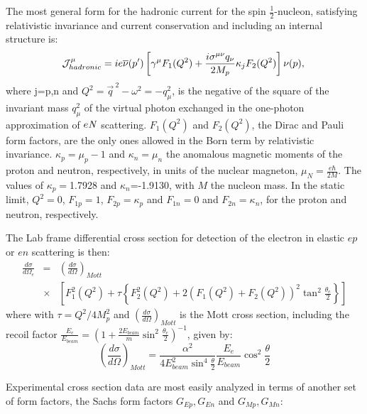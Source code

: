 The most general form for the hadronic current for the spin $\frac{1}{2}$-nucleon, satisfying relativistic invariance
and current conservation and including an internal structure is:\\
\begin{equation}
{\mathcal J}_{hadronic}^{\mu}=ie\overline{\nu}(p')\left[\gamma^{\mu}{{F_1(Q^2)}}+
\frac{i\sigma^{\mu\nu}q_{\nu}}{2M_p}\kappa_{j}{{F_2(Q^2)}}\right]\nu(p), \\
\label{eq:Jhadron}
\end{equation}
\noindent where j=p,n and $Q^2=\vec{q}^{~2}-\omega^2=-q_{\mu}^{ 2}$, is the negative of the square of the
invariant mass $q_{\mu}^2 $ of the virtual photon exchanged in the one-photon
approximation of $e{\it N}$ scattering. $F_1(Q^2)$ and $F_2(Q^2)$, the Dirac and Pauli form factors, are the only ones
allowed in the Born term by relativistic invariance. $\kappa_p=\mu_p-1$ and $\kappa_n=\mu_n$ the anomalous
 magnetic moments of the proton
 and neutron, respectively, in units of the nuclear magneton, $\mu_N=\frac{e\hbar}{2M}$. The values of
$\kappa_p=$1.7928 and $\kappa_n$=-1.9130, with  ${M}$ the nucleon mass.
In the static limit, $Q^2=0$, $F_{1p}=1$, $F_{2p}=\kappa_p$ and $F_{1n}=0$ and $F_{2n}=\kappa_n$,
for the proton and neutron, respectively.

The Lab frame differential cross section for detection of the electron in elastic $ep$ or $en$ scattering is then:
\begin{eqnarray}
\frac{d\sigma}{d\Omega_e}&=&\left(\frac{d\sigma}{d\Omega}\right)_{Mott} \nonumber \\
 &\times&\left[F_1^2(Q^2)+\tau \left\{F_2^2(Q^2)+2(F_1(Q^2)+F_2(Q^2))^2\tan^2\frac{\theta_e}{2}\right\}\right]
\end{eqnarray}
\noindent
where with $\tau=Q^2/4M_p^2$ and $(\frac{d\sigma}{d\Omega})_{Mott}$ is the Mott cross section, including the recoil factor
$\frac{E_e}{E_{beam}}=(1+\frac{2E_{beam}}{m}\sin^2\frac{\theta_e}{2})^{-1}$, given by:
\begin{equation}
\left(\frac{d\sigma}{d\Omega}\right)_{Mott}=\frac{\alpha^2}{4E_{beam}^2\sin^4
\frac{\theta}{2}}\frac{E_e}{E_{beam}}\cos^2\frac{\theta}{2}
\label{eq:csF1F2}
\end{equation}

Experimental cross section data are most easily analyzed in terms of another set of form factors, the Sachs form
factors $G_{Ep}, G_{En}$ and $G_{Mp}, G_{Mn}$:

